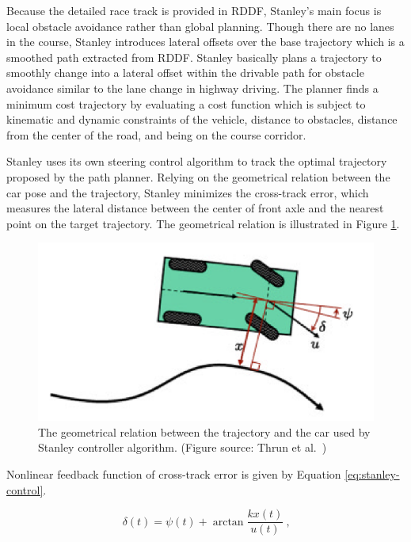 Because the detailed race track is provided in RDDF, Stanley's main focus is
local obstacle avoidance rather than global planning. Though there are no lanes
in the course, Stanley introduces lateral offsets over the base trajectory
which is a smoothed path extracted from RDDF. Stanley basically plans a
trajectory to smoothly change into a lateral offset within the drivable path
for obstacle avoidance similar to the lane change in highway driving. The
planner finds a minimum cost trajectory by evaluating a cost function which is
subject to kinematic and dynamic constraints of the vehicle, distance to
obstacles, distance from the center of the road, and being on the course
corridor.

Stanley uses its own steering control algorithm to track the optimal trajectory
proposed by the path planner. Relying on the geometrical relation between the
car pose and the trajectory, Stanley minimizes the cross-track error, which
measures the lateral distance between the center of front axle and the nearest
point on the target trajectory. The geometrical relation is illustrated in
Figure \ref{figure:stanley-control}.

\begin{figure}[h]
  \centering
  \includegraphics[width=.8\textwidth]{figures/stanley-control.png}
  \caption[Stanley controller algorithm]{The geometrical relation between the
    trajectory and the car used by Stanley controller algorithm. (Figure
    source: Thrun et al.\ \cite{Thrun2006StanleyTR})}
  \label{figure:stanley-control}
\end{figure}

Nonlinear feedback function of cross-track error is given by Equation
\eqref{eq:stanley-control}.

\begin{equation}
  \delta(t) = \psi(t) + \arctan\frac{kx(t)}{u(t)}\ \textbf{,}
  \label{eq:stanley-control}
\end{equation}

